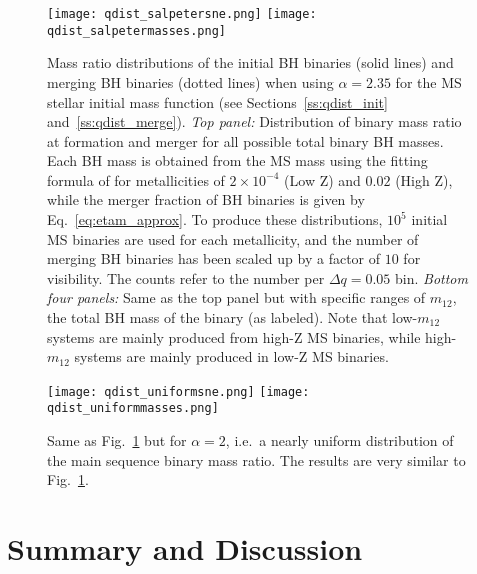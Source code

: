 \documentclass[
        fleqn,
        usenatbib,
    ]{mnras}
\begin{document}
\begin{figure}
    \centering
    \texttt{[image: qdist\_salpetersne.png]}
    \texttt{[image: qdist\_salpetermasses.png]}
    \caption{Mass ratio distributions of the initial BH binaries (solid lines)
    and merging BH binaries (dotted lines) when using $\alpha = 2.35$ for the MS
    stellar initial mass function (see Sections~\ref{ss:qdist_init}
    and~\ref{ss:qdist_merge}). \emph{Top panel:} Distribution of binary mass
    ratio at formation and merger for all possible total binary BH masses. Each
    BH mass is obtained from the MS mass using the fitting formula of
    \citet{spera2017very} for metallicities of $2 \times 10^{-4}$ (Low Z) and
    $0.02$ (High Z), while the merger fraction of BH binaries is given by
    Eq.~\eqref{eq:etam_approx}. To produce these distributions, $10^5$ initial
    MS binaries are used for each metallicity, and the number of merging BH
    binaries has been scaled up by a factor of $10$ for visibility. The counts
    refer to the number per $\Delta q = 0.05$ bin. \emph{Bottom four panels:}
    Same as the top panel but with specific ranges of $m_{12}$, the total BH
    mass of the binary (as labeled). Note that low-$m_{12}$ systems are mainly
    produced from high-Z MS binaries, while high-$m_{12}$ systems are mainly
    produced in low-Z MS binaries. }\label{fig:qdist_salpeter}
\end{figure}
\begin{figure}
    \centering
    \texttt{[image: qdist\_uniformsne.png]}
    \texttt{[image: qdist\_uniformmasses.png]}
    \caption{Same as Fig.~\ref{fig:qdist_salpeter} but for $\alpha = 2$, i.e.\ a
    nearly uniform distribution of the main sequence binary mass
    ratio. The results are very similar to Fig.~\ref{fig:qdist_salpeter}.
    }\label{fig:qdist_uniform}
\end{figure}

\section{Summary and Discussion}\label{s:conclusion}
\end{document}
